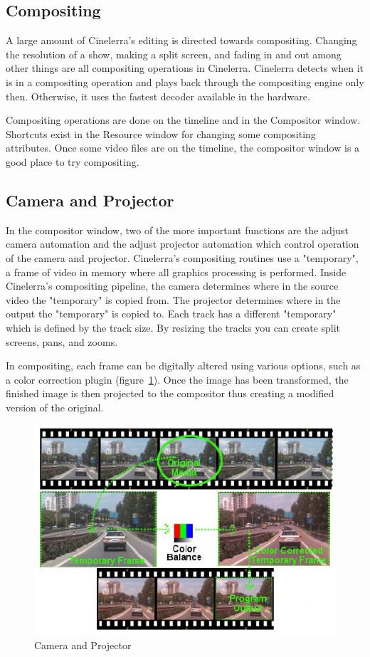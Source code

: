 \subsection{Compositing}%
\label{sub:compositing}

A large amount of Cinelerra's editing is directed towards compositing. 
Changing the resolution of a show, making a split screen, and fading in and out among other things are all compositing operations in Cinelerra. 
Cinelerra detects when it is in a compositing operation and plays back through the compositing engine only then. 
Otherwise, it uses the fastest decoder available in the hardware.

Compositing operations are done on the timeline and in the Compositor window. Shortcuts exist in the Resource window for changing some compositing attributes. 
Once some video files are on the timeline, the compositor window is a good place to try compositing.

\subsection{Camera and Projector}%
\label{sub:camera_and_projector}

In the compositor window, two of the more important functions are the adjust camera automation and the adjust projector automation which control operation of the camera and projector. 
Cinelerra's compositing routines use a "temporary", a frame of video in memory where all graphics processing is performed. 
Inside Cinelerra's compositing pipeline, the camera determines where in the source video the "temporary" is copied from. 
The projector determines where in the output the "temporary" is copied to. 
Each track has a different "temporary" which is defined by the track size. By resizing the tracks you can create split screens, pans, and zooms.

In compositing, each frame can be digitally altered using various options, such as a color correction plugin (figure~\ref{fig:camera_and_projector}). 
Once the image has been transformed, the finished image is then projected to the compositor thus creating a modified version of the original.

\begin{figure}[htpb]
    \centering
    \includegraphics[width=0.8\linewidth]{images/camera_and_projector.png}
    \caption{Camera and Projector}
    \label{fig:camera_and_projector}
\end{figure}

